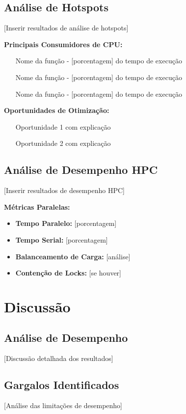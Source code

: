 \documentclass[a4paper,11pt]{article}
\begin{document}
\subsection{Análise de Hotspots}

[Inserir resultados de análise de hotspots]

\textbf{Principais Consumidores de CPU:}
\begin{enumerate}
    \item [Nome da função] - [porcentagem] do tempo de execução
    \item [Nome da função] - [porcentagem] do tempo de execução
    \item [Nome da função] - [porcentagem] do tempo de execução
\end{enumerate}

\textbf{Oportunidades de Otimização:}
\begin{itemize}
    \item [Oportunidade 1 com explicação]
    \item [Oportunidade 2 com explicação]
\end{itemize}

\subsection{Análise de Desempenho HPC}

[Inserir resultados de desempenho HPC]

\textbf{Métricas Paralelas:}
\begin{itemize}
    \item \textbf{Tempo Paralelo:} [porcentagem]
    \item \textbf{Tempo Serial:} [porcentagem]
    \item \textbf{Balanceamento de Carga:} [análise]
    \item \textbf{Contenção de Locks:} [se houver]
\end{itemize}

\section{Discussão}

\subsection{Análise de Desempenho}
[Discussão detalhada dos resultados]

\subsection{Gargalos Identificados}
[Análise das limitações de desempenho]
\end{document}
